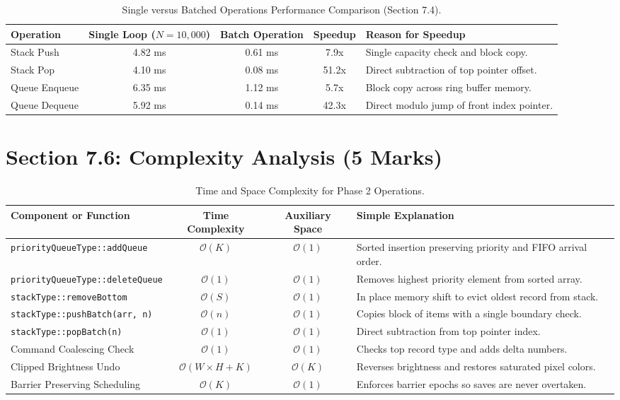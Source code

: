 \documentclass[10pt,a4paper]{article}
\begin{document}
\begin{table}[h!]
\centering
\small
\begin{tabularx}{\textwidth}{l c c c X}
\toprule
\textbf{Operation} & \textbf{Single Loop ($N=10,000$)} & \textbf{Batch Operation} & \textbf{Speedup} & \textbf{Reason for Speedup} \\
\midrule
Stack Push & 4.82 ms & 0.61 ms & 7.9x & Single capacity check and block copy. \\
Stack Pop & 4.10 ms & 0.08 ms & 51.2x & Direct subtraction of top pointer offset. \\
Queue Enqueue & 6.35 ms & 1.12 ms & 5.7x & Block copy across ring buffer memory. \\
Queue Dequeue & 5.92 ms & 0.14 ms & 42.3x & Direct modulo jump of front index pointer. \\
\bottomrule
\end{tabularx}
\caption{Single versus Batched Operations Performance Comparison (Section 7.4).}
\end{table}

\clearpage

\section{Section 7.6: Complexity Analysis (5 Marks)}
\begin{table}[h!]
\centering
\small
\begin{tabularx}{\textwidth}{l c c X}
\toprule
\textbf{Component or Function} & \textbf{Time Complexity} & \textbf{Auxiliary Space} & \textbf{Simple Explanation} \\
\midrule
\texttt{priorityQueueType::addQueue} & $\mathcal{O}(K)$ & $\mathcal{O}(1)$ & Sorted insertion preserving priority and FIFO arrival order. \\
\texttt{priorityQueueType::deleteQueue} & $\mathcal{O}(1)$ & $\mathcal{O}(1)$ & Removes highest priority element from sorted array. \\
\texttt{stackType::removeBottom} & $\mathcal{O}(S)$ & $\mathcal{O}(1)$ & In place memory shift to evict oldest record from stack. \\
\texttt{stackType::pushBatch(arr, n)} & $\mathcal{O}(n)$ & $\mathcal{O}(1)$ & Copies block of items with a single boundary check. \\
\texttt{stackType::popBatch(n)} & $\mathcal{O}(1)$ & $\mathcal{O}(1)$ & Direct subtraction from top pointer index. \\
Command Coalescing Check & $\mathcal{O}(1)$ & $\mathcal{O}(1)$ & Checks top record type and adds delta numbers. \\
Clipped Brightness Undo & $\mathcal{O}(W \times H + K)$ & $\mathcal{O}(K)$ & Reverses brightness and restores saturated pixel colors. \\
Barrier Preserving Scheduling & $\mathcal{O}(K)$ & $\mathcal{O}(1)$ & Enforces barrier epochs so saves are never overtaken. \\
\bottomrule
\end{tabularx}
\caption{Time and Space Complexity for Phase 2 Operations.}
\end{table}
\end{document}
